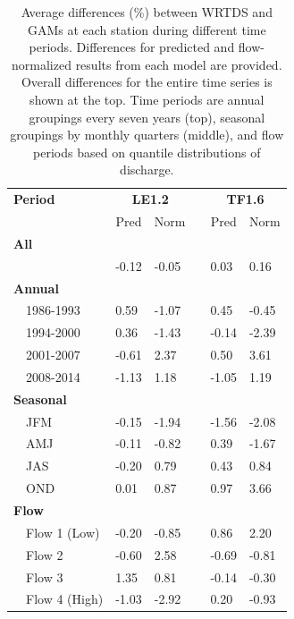 \documentclass[letterpaper,12pt,oneside]{article}\usepackage[]{graphicx}\usepackage[]{color}
\begin{document}
\begin{table}[!tbp]
\caption{Average differences (\%) between \ac{WRTDS} and \acp{GAM} at each station during different time periods.  Differences for predicted and flow-normalized results from each model are provided.  Overall differences for the entire time series is shown at the top.  Time periods are annual groupings every seven years (top), seasonal groupings by monthly quarters (middle), and flow periods based on quantile distributions of discharge.\label{tab:avediff}} 
\begin{center}
\begin{tabular}{lllcll}
\hline\hline
\multicolumn{1}{l}{\bfseries Period}&\multicolumn{2}{c}{\bfseries LE1.2}&\multicolumn{1}{c}{\bfseries }&\multicolumn{2}{c}{\bfseries TF1.6}\tabularnewline
\cline{2-3} \cline{5-6}
\multicolumn{1}{l}{}&\multicolumn{1}{c}{Pred}&\multicolumn{1}{c}{Norm}&\multicolumn{1}{c}{}&\multicolumn{1}{c}{Pred}&\multicolumn{1}{c}{Norm}\tabularnewline
\hline
{\bfseries All}&&&&&\tabularnewline
~~&-0.12&-0.05&& 0.03& 0.16\tabularnewline
\hline
{\bfseries Annual}&&&&&\tabularnewline
~~1986-1993& 0.59&-1.07&& 0.45&-0.45\tabularnewline
~~1994-2000& 0.36&-1.43&&-0.14&-2.39\tabularnewline
~~2001-2007&-0.61& 2.37&& 0.50& 3.61\tabularnewline
~~2008-2014&-1.13& 1.18&&-1.05& 1.19\tabularnewline
\hline
{\bfseries Seasonal}&&&&&\tabularnewline
~~JFM&-0.15&-1.94&&-1.56&-2.08\tabularnewline
~~AMJ&-0.11&-0.82&& 0.39&-1.67\tabularnewline
~~JAS&-0.20& 0.79&& 0.43& 0.84\tabularnewline
~~OND& 0.01& 0.87&& 0.97& 3.66\tabularnewline
\hline
{\bfseries Flow}&&&&&\tabularnewline
~~Flow 1 (Low)&-0.20&-0.85&& 0.86& 2.20\tabularnewline
~~Flow 2&-0.60& 2.58&&-0.69&-0.81\tabularnewline
~~Flow 3& 1.35& 0.81&&-0.14&-0.30\tabularnewline
~~Flow 4 (High)&-1.03&-2.92&& 0.20&-0.93\tabularnewline
\hline
\end{tabular}\end{center}

\end{table}
\end{document}
